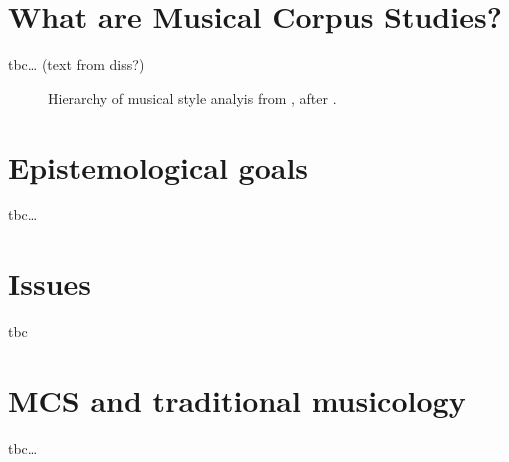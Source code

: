 \documentclass[letterpaper,10pt,english]{sphinxmanual}
\begin{document}
\clearpage


\section{What are Musical Corpus Studies?}
\label{\detokenize{2_introduction:what-are-musical-corpus-studies}}
tbc… (text from diss?)

\begin{figure}[htbp]
\centering
\capstart

\noindent{}
\caption{Hierarchy of musical style analyis from , after .}\label{\detokenize{2_introduction:id11}}\end{figure}


\section{Epistemological goals}
\label{\detokenize{2_introduction:epistemological-goals}}
tbc…


\section{Issues}
\label{\detokenize{2_introduction:issues}}
tbc 


\section{MCS and traditional musicology}
\label{\detokenize{2_introduction:mcs-and-traditional-musicology}}
tbc…
\end{document}
